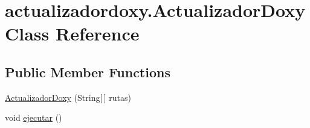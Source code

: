 \hypertarget{classactualizadordoxy_1_1_actualizador_doxy}{}\section{actualizadordoxy.\+Actualizador\+Doxy Class Reference}
\label{classactualizadordoxy_1_1_actualizador_doxy}
\subsection*{Public Member Functions}
\begin{DoxyCompactItemize}
\item 
\mbox{\hyperlink{classactualizadordoxy_1_1_actualizador_doxy_a380363d2f93108de5f30dea17ba26946}{Actualizador\+Doxy}} (String\mbox{[}$\,$\mbox{]} rutas)
\item 
void \mbox{\hyperlink{classactualizadordoxy_1_1_actualizador_doxy_ad31b85897c4caa3b43291e89f88ca417}{ejecutar}} ()
\end{DoxyCompactItemize}

